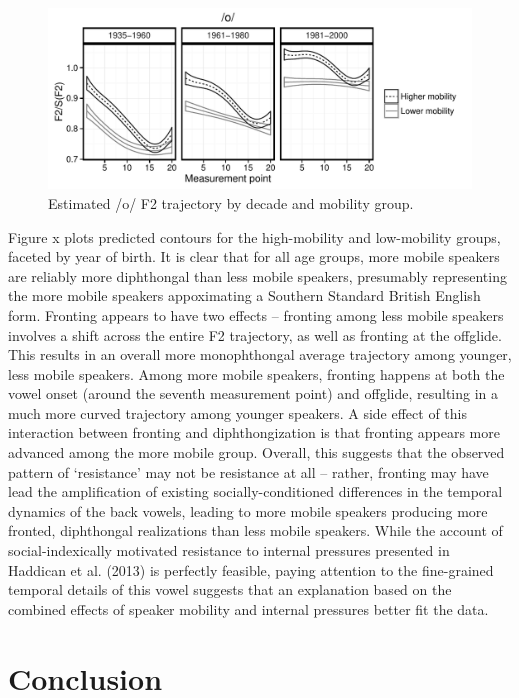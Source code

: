 \documentclass[12pt]{article}
\begin{document}
\begin{figure}
\centering
\includegraphics[scale=0.9]{owdynamicsclass.pdf}
\caption{Estimated /o/ F2 trajectory by decade and mobility group.}
\end{figure}

Figure x plots predicted contours for the high-mobility and low-mobility groups, faceted by year of birth. It is clear that for all age groups, more mobile speakers are reliably more diphthongal than less mobile speakers, presumably representing the more mobile speakers appoximating a Southern Standard British English form. Fronting appears to have two effects -- fronting among less mobile speakers involves a shift across the entire F2 trajectory, as well as fronting at the offglide. This results in an overall more monophthongal average trajectory among younger, less mobile speakers. Among more mobile speakers, fronting happens at both the vowel onset (around the seventh measurement point) and offglide, resulting in a much more curved trajectory among younger speakers. A side effect of this interaction between fronting and diphthongization is that fronting appears more advanced among the more mobile group. Overall, this suggests that the observed pattern of `resistance' may not be resistance at all -- rather, fronting may have lead the amplification of existing socially-conditioned differences in the temporal dynamics of the back vowels, leading to more mobile speakers producing more fronted, diphthongal realizations than less mobile speakers. While the account of social-indexically motivated resistance to internal pressures presented in Haddican et al. (2013) is perfectly feasible, paying attention to the fine-grained temporal details of this vowel suggests that an explanation based on the combined effects of speaker mobility and internal pressures better fit the data.

\section{Conclusion}
\end{document}
